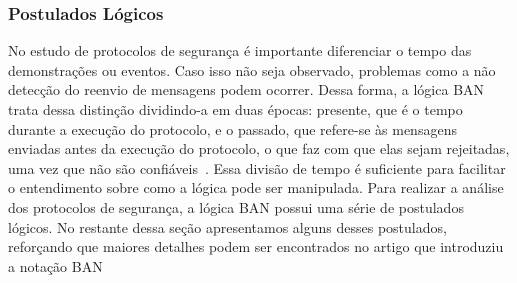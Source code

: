 \subsubsection{Postulados Lógicos}

No estudo de protocolos de segurança é importante diferenciar o tempo das demonstrações ou eventos. Caso isso não seja observado, problemas como a não detecção do reenvio de mensagens podem ocorrer. Dessa forma, a lógica BAN trata dessa distinção dividindo-a em duas épocas: presente, que é o tempo durante a execução do protocolo, e o passado, que refere-se às mensagens enviadas antes da execução do protocolo, o que faz com que elas sejam rejeitadas, uma vez que não são confiáveis~\cite{Burrows1990}. Essa divisão de tempo é suficiente para facilitar o entendimento sobre como a lógica pode ser manipulada. Para realizar a análise dos protocolos de segurança, a lógica BAN possui uma série de postulados lógicos. No restante dessa seção apresentamos alguns desses postulados, reforçando que maiores detalhes podem ser encontrados no artigo que introduziu a notação BAN~\cite{Burrows1990}

